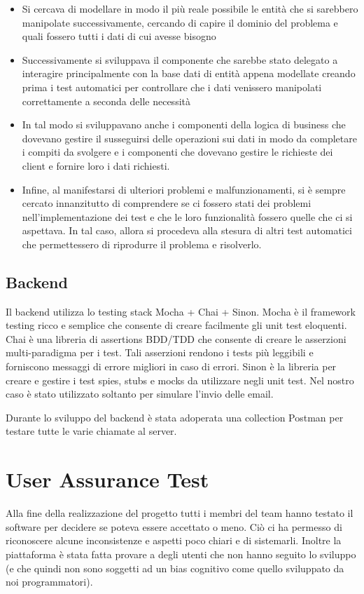 \begin{itemize}

    \item Si cercava di modellare in modo il più reale possibile le entità che si sarebbero manipolate successivamente, cercando di capire il dominio del problema e quali fossero tutti i dati di cui avesse bisogno
    
    \item Successivamente si sviluppava il componente che sarebbe stato delegato a interagire principalmente con la base dati di entità appena modellate creando prima i test automatici per controllare che i dati venissero manipolati correttamente a seconda delle necessità
    
    \item In tal modo si sviluppavano anche i componenti della logica di business che dovevano gestire il susseguirsi delle operazioni sui dati in modo da completare i compiti da svolgere e i componenti che dovevano gestire le richieste dei client e fornire loro i dati richiesti.
    
    \item Infine, al manifestarsi di ulteriori problemi e malfunzionamenti, si è sempre cercato innanzitutto di comprendere se ci fossero stati dei problemi nell'implementazione dei test e che le loro funzionalità fossero quelle che ci si aspettava. In tal caso, allora si procedeva alla stesura di altri test automatici che permettessero di riprodurre il problema e risolverlo.
    
\end{itemize}

 \subsection{Backend}
 Il backend utilizza lo testing stack Mocha + Chai + Sinon. 
Mocha è il framework testing ricco e semplice che consente di creare facilmente
gli unit test eloquenti.
Chai è una libreria di assertions BDD/TDD che consente di creare le asserzioni
multi-paradigma per i test. Tali asserzioni rendono i tests più leggibili e forniscono messaggi di errore migliori in caso di errori. 
Sinon è la libreria per creare e gestire i test spies, stubs e mocks da utilizzare
negli unit test. Nel nostro caso è stato utilizzato soltanto per simulare l'invio delle email.

Durante lo sviluppo del backend è stata adoperata una collection Postman per testare tutte le varie chiamate al server. 

\section{User Assurance Test}
Alla fine della realizzazione del progetto tutti i membri del team hanno testato il software per decidere se poteva essere accettato o meno. Ciò ci ha permesso di riconoscere alcune inconsistenze e aspetti poco chiari e di sistemarli. Inoltre la piattaforma è stata fatta provare a degli utenti che non
hanno seguito lo sviluppo (e che quindi non sono soggetti ad un bias cognitivo come
quello sviluppato da noi programmatori).
